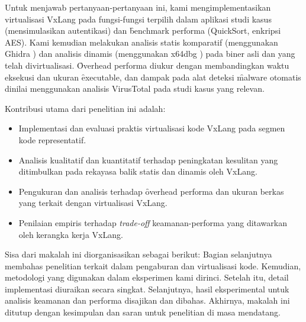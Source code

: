 Untuk menjawab pertanyaan-pertanyaan ini, kami mengimplementasikan virtualisasi VxLang pada fungsi-fungsi terpilih dalam aplikasi studi kasus (mensimulasikan autentikasi) dan \f{benchmark} performa (QuickSort, enkripsi AES). Kami kemudian melakukan analisis statis komparatif (menggunakan Ghidra \cite{Nat19}) dan analisis dinamis (menggunakan x64dbg \cite{Dun14}) pada biner asli dan yang telah divirtualisasi. \f{Overhead} performa diukur dengan membandingkan waktu eksekusi dan ukuran \f{executable}, dan dampak pada alat deteksi \f{malware} otomatis dinilai menggunakan analisis VirusTotal pada studi kasus yang relevan.

Kontribusi utama dari penelitian ini adalah:
\begin{itemize}
    \item Implementasi dan evaluasi praktis virtualisasi kode VxLang pada segmen kode representatif.
    \item Analisis kualitatif dan kuantitatif terhadap peningkatan kesulitan yang ditimbulkan pada rekayasa balik statis dan dinamis oleh VxLang.
    \item Pengukuran dan analisis terhadap \f{overhead} performa dan ukuran berkas yang terkait dengan virtualisasi VxLang.
    \item Penilaian empiris terhadap \textit{trade-off} keamanan-performa yang ditawarkan oleh kerangka kerja VxLang.
\end{itemize}

Sisa dari makalah ini diorganisasikan sebagai berikut: Bagian selanjutnya membahas penelitian terkait dalam pengaburan dan virtualisasi kode. Kemudian, metodologi yang digunakan dalam eksperimen kami dirinci. Setelah itu, detail implementasi diuraikan secara singkat. Selanjutnya, hasil eksperimental untuk analisis keamanan dan performa disajikan dan dibahas. Akhirnya, makalah ini ditutup dengan kesimpulan dan saran untuk penelitian di masa mendatang.
